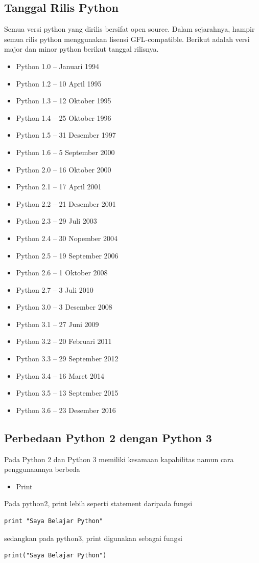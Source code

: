 \subsection{Tanggal Rilis Python}
Semua versi python yang dirilis bersifat open source. Dalam sejarahnya, hampir semua rilis python menggunakan lisensi GFL-compatible. Berikut adalah versi major dan minor python berikut tanggal rilisnya.
\begin{itemize}
  \item Python 1.0 – Januari 1994
  \item Python 1.2 – 10 April 1995
  \item Python 1.3 – 12 Oktober 1995
  \item Python 1.4 – 25 Oktober 1996
  \item Python 1.5 – 31 Desember 1997
  \item Python 1.6 – 5 September 2000
  \item Python 2.0 – 16 Oktober 2000
  \item Python 2.1 – 17 April 2001
  \item Python 2.2 – 21 Desember 2001
  \item Python 2.3 – 29 Juli 2003
  \item Python 2.4 – 30 Nopember 2004
  \item Python 2.5 – 19 September 2006
  \item Python 2.6 – 1 Oktober 2008
  \item Python 2.7 – 3 Juli 2010
  \item Python 3.0 – 3 Desember 2008
  \item Python 3.1 – 27 Juni 2009
  \item Python 3.2 – 20 Februari 2011
  \item Python 3.3 – 29 September 2012
  \item Python 3.4 – 16 Maret 2014
  \item Python 3.5 – 13 September 2015
  \item Python 3.6 – 23 Desember 2016
\end{itemize}

\subsection{Perbedaan Python 2 dengan Python 3}
Pada Python 2 dan Python 3 memiliki kesamaan kapabilitas namun cara penggunaannya berbeda
\begin{itemize}
\item Print
\end{itemize}
Pada python2, print lebih seperti statement daripada fungsi
\begin{lstlisting}
print "Saya Belajar Python"
\end{lstlisting}
sedangkan pada python3, print digunakan sebagai fungsi
\begin{lstlisting}
print("Saya Belajar Python")
\end{lstlisting}

